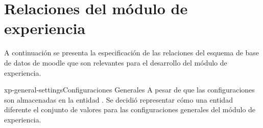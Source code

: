 
\section{Relaciones del módulo de experiencia}

 A continuación se presenta la especificación de las relaciones del esquema de base
 de datos de moodle que son relevantes para el desarrollo del módulo de experiencia.

    \begin{cdtEntidad}{xp-general-settings}{Configuraciones Generales}{
    A pesar de que las configuraciones son almacenadas en la entidad 
    . Se decidió representar cómo una entidad diferente 
    el conjunto de valores para las configuraciones generales del módulo de 
    experiencia.}


    \end{cdtEntidad}

